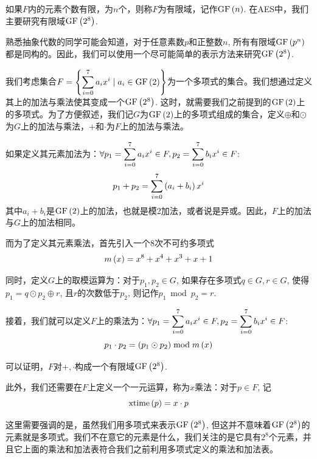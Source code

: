 如果$F$内的元素个数有限，为$n$个，则称$F$为有限域，记作$\mathrm{GF}\left( {n}\right)$. 在AES中，我们主要研究有限域$\mathrm{GF}\left( {2^8}\right)$.\par
熟悉抽象代数的同学可能会知道，对于任意素数$p$和正整数$n$, 所有有限域$\mathrm{GF}\left( {p^n}\right)$都是同构的。因此，我们可以使用一个尽可能简单的表示方法来研究$\mathrm{GF}\left( {2^8}\right)$.\par
我们考虑集合$\displaystyle F=\left\{ {\sum_{i=0}^7a_ix^i\mid a_i\in\mathrm{GF}\left( {2}\right)} \right\}$为一个多项式的集合。我们想通过定义其上的加法与乘法使其变成一个$\mathrm{GF}\left( {2^8}\right)$. 这时，就需要我们之前提到的$\mathrm{GF}\left( {2}\right)$上的多项式。为了方便叙述，我们记$G$为$\mathrm{GF}\left( {2}\right)$上的多项式组成的集合，定义$\oplus$和$\odot$为$G$上的加法与乘法，$+$和$\cdot$为$F$上的加法与乘法。\par
如果定义其元素加法为：$\displaystyle\forall p_1=\sum_{i=0}^7a_ix^i\in F, p_2=\sum_{i=0}^7b_ix^i\in F$:
\begin{equation}
p_1+p_2=\sum_{i=0}^7\left( {a_i+b_i}\right)x^i
\end{equation}
其中$a_i+b_i$是$\mathrm{GF}\left( {2}\right)$上的加法，也就是模2加法，或者说是异或。因此，$F$上的加法与$G$上的加法相同。\par
而为了定义其元素乘法，首先引入一个8次不可约多项式
\begin{equation}
m\left( {x}\right)=x^8+x^4+x^3+x+1
\end{equation}

同时，定义$G$上的取模运算为：对于$p_1, p_2\in G$, 如果存在多项式$q\in G, r\in G$, 使得$p_1=q\odot p_2\oplus r$, 且$r$的次数低于$p_2$, 则记作$p_1\bmod{p_2}=r$.\par
接着，我们就可以定义$F$上的乘法为：$\displaystyle\forall p_1=\sum_{i=0}^7a_ix^i\in F, p_2=\sum_{i=0}^7b_ix^i\in F$:
\begin{equation}
p_1\cdot p_2= \left( {p_1\odot p_2}\right)\bmod{m\left( {x}\right)}
\end{equation}

可以证明，$F$对$+, \cdot$构成一个有限域$\mathrm{GF}\left( {2^8}\right)$.\par
此外，我们还需要在$F$上定义一个一元运算，称为$x$乘法：对于$p\in F$, 记
\begin{equation}
\mathrm{xtime}\left( {p}\right)=x\cdot p
\end{equation}

这里需要强调的是，虽然我们用多项式来表示$\mathrm{GF}\left( {2^8}\right)$, 但这并不意味着$\mathrm{GF}\left( {2^8}\right)$的元素就是多项式。我们不在意它的元素是什么，我们关注的是它具有$2^8$个元素，并且它上面的乘法和加法表符合我们之前利用多项式定义的乘法和加法表。
